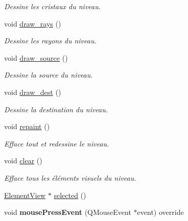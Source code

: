 \begin{DoxyCompactItemize}
\begin{DoxyCompactList}\small\item\em Dessine les cristaux du niveau. \end{DoxyCompactList}\item 
\hypertarget{classMapView_a47460ba6134d7b9b0f696de8f4f6aa8a}{void \hyperlink{classMapView_a47460ba6134d7b9b0f696de8f4f6aa8a}{draw\+\_\+rays} ()}\label{classMapView_a47460ba6134d7b9b0f696de8f4f6aa8a}

\begin{DoxyCompactList}\small\item\em Dessine les rayons du niveau. \end{DoxyCompactList}\item 
\hypertarget{classMapView_a7673cc6dc5da8a4312d4588bc3d8b8d0}{void \hyperlink{classMapView_a7673cc6dc5da8a4312d4588bc3d8b8d0}{draw\+\_\+source} ()}\label{classMapView_a7673cc6dc5da8a4312d4588bc3d8b8d0}

\begin{DoxyCompactList}\small\item\em Dessine la source du niveau. \end{DoxyCompactList}\item 
\hypertarget{classMapView_afffa3910baaace753c00ce187fd7115a}{void \hyperlink{classMapView_afffa3910baaace753c00ce187fd7115a}{draw\+\_\+dest} ()}\label{classMapView_afffa3910baaace753c00ce187fd7115a}

\begin{DoxyCompactList}\small\item\em Dessine la destination du niveau. \end{DoxyCompactList}\item 
\hypertarget{classMapView_a7e354e304c2f0135103a8773a8a8e0d4}{void \hyperlink{classMapView_a7e354e304c2f0135103a8773a8a8e0d4}{repaint} ()}\label{classMapView_a7e354e304c2f0135103a8773a8a8e0d4}

\begin{DoxyCompactList}\small\item\em Efface tout et redessine le niveau. \end{DoxyCompactList}\item 
\hypertarget{classMapView_a1c41de9351ee9f91008be7a201a3a99c}{void \hyperlink{classMapView_a1c41de9351ee9f91008be7a201a3a99c}{clear} ()}\label{classMapView_a1c41de9351ee9f91008be7a201a3a99c}

\begin{DoxyCompactList}\small\item\em Efface tous les éléments visuels du niveau. \end{DoxyCompactList}\item 
\hyperlink{classElementView}{Element\+View} $\ast$ \hyperlink{classMapView_ab1af933413ea299a5f6d735561623471}{selected} ()
\item 
\hypertarget{classMapView_accba42446f4e70fe4c6f1754b9d45ba9}{void {\bfseries mouse\+Press\+Event} (Q\+Mouse\+Event $\ast$event) override}\label{classMapView_accba42446f4e70fe4c6f1754b9d45ba9}


\end{DoxyCompactItemize}
